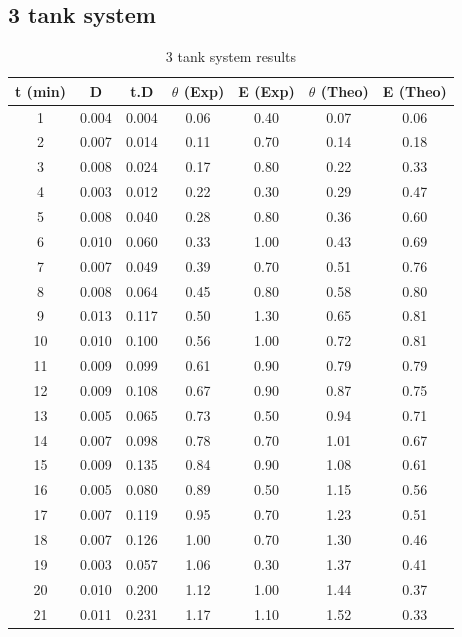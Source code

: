 \subsection{3 tank system}
\begin{table}[H]
    \centering
    \caption{3 tank system results}
    \begin{tabular}{ccccccc}
        \hline
        \textbf{t (min)} & \textbf{D} & \textbf{t.D} & \textbf{$\theta$ (Exp)} & \textbf{E (Exp)} & \textbf{$\theta$ (Theo)} & \textbf{E (Theo)} \\
        \hline
        1 & 0.004 & 0.004 & 0.06 & 0.40 & 0.07 & 0.06 \\
        2 & 0.007 & 0.014 & 0.11 & 0.70 & 0.14 & 0.18 \\
        3 & 0.008 & 0.024 & 0.17 & 0.80 & 0.22 & 0.33 \\
        4 & 0.003 & 0.012 & 0.22 & 0.30 & 0.29 & 0.47 \\
        5 & 0.008 & 0.040 & 0.28 & 0.80 & 0.36 & 0.60 \\
        6 & 0.010 & 0.060 & 0.33 & 1.00 & 0.43 & 0.69 \\
        7 & 0.007 & 0.049 & 0.39 & 0.70 & 0.51 & 0.76 \\
        8 & 0.008 & 0.064 & 0.45 & 0.80 & 0.58 & 0.80 \\
        9 & 0.013 & 0.117 & 0.50 & 1.30 & 0.65 & 0.81 \\
        10 & 0.010 & 0.100 & 0.56 & 1.00 & 0.72 & 0.81 \\
        11 & 0.009 & 0.099 & 0.61 & 0.90 & 0.79 & 0.79 \\
        12 & 0.009 & 0.108 & 0.67 & 0.90 & 0.87 & 0.75 \\
        13 & 0.005 & 0.065 & 0.73 & 0.50 & 0.94 & 0.71 \\
        14 & 0.007 & 0.098 & 0.78 & 0.70 & 1.01 & 0.67 \\
        15 & 0.009 & 0.135 & 0.84 & 0.90 & 1.08 & 0.61 \\
        16 & 0.005 & 0.080 & 0.89 & 0.50 & 1.15 & 0.56 \\
        17 & 0.007 & 0.119 & 0.95 & 0.70 & 1.23 & 0.51 \\
        18 & 0.007 & 0.126 & 1.00 & 0.70 & 1.30 & 0.46 \\
        19 & 0.003 & 0.057 & 1.06 & 0.30 & 1.37 & 0.41 \\
        20 & 0.010 & 0.200 & 1.12 & 1.00 & 1.44 & 0.37 \\
        21 & 0.011 & 0.231 & 1.17 & 1.10 & 1.52 & 0.33 \\

\end{tabular}
\end{table}
